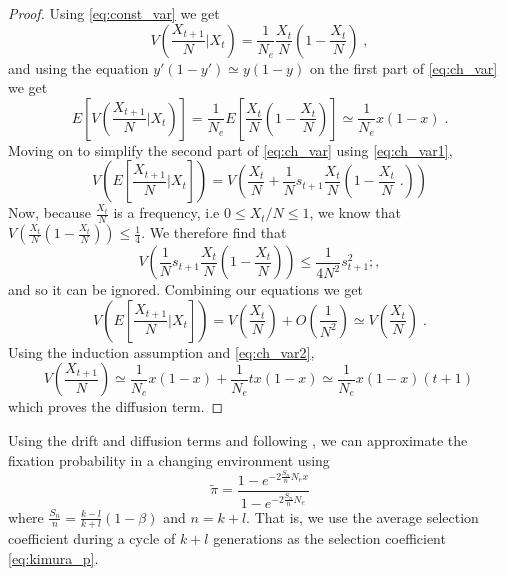 \documentclass[12pt]{extarticle}
\begin{document}
\begin{proof}
Using \cref{eq:const_var} we get
\begin{equation}
V\left(\frac{X_{t+1}}{N} \bigg|X_t \right) 
= \frac{1}{N_e}\frac{X_t}{N}\left(1-\frac{X_t}{N} \right) \;,
\end{equation}
and using the equation $y'(1-y') \simeq y(1-y)$ on the first part of \cref{eq:ch_var} we get
\begin{equation}\label{eq:ch_var2}
E\left[V\left(\frac{X_{t+1}}{N} \bigg|X_t \right)\right] 
= \frac{1}{N_e}E\left[\frac{X_t}{N}\left(1- \frac{X_t}{N}\right) \right] \simeq \frac{1}{N_e} x(1-x) \;.
\end{equation}
Moving on to simplify the second part of \cref{eq:ch_var} using \cref{eq:ch_var1},
\begin{equation}
V\left(E\left[\frac{X_{t+1}}{N} \bigg|X_t \right]\right) 
= V\left(\frac{X_t}{N} + \frac{1}{N}s_{t+1}\frac{X_t}{N}\left(1-\frac{X_t}{N} \;.\right) \right)
\end{equation}
Now, because $\frac{X_t}{N}$ is a frequency, i.e $0 \leq X_t/N \leq 1$, we know that $V\left(\frac{X_t}{N}\left(1-\frac{X_t}{N} \right) \right)\leq\frac{1}{4}$. We therefore find that
\begin{equation}
V\left(\frac{1}{N}s_{t+1}\frac{X_t}{N}\left(1-\frac{X_t}{N} \right) \right)
\leq \frac{1}{4N^2}s^2_{t+1} ;,
\end{equation}
and so it can be ignored.
Combining our equations we get
\begin{equation}
V\left(E\left[\frac{X_{t+1}}{N} \bigg|X_t \right]\right) 
= V\left(\frac{X_t}{N}\right) + O\left(\frac{1}{N^2}\right)\simeq V\left(\frac{X_t}{N}\right) \;.
\end{equation}
Using the induction assumption and \cref{eq:ch_var2},
\begin{equation}
V\left(\frac{X_{t+1}}{N}\right) 
\simeq \frac{1}{N_e}x(1-x) + \frac{1}{N_e}tx(1-x) \simeq \frac{1}{N_e}x(1-x)(t+1) \,
\end{equation}
which proves the diffusion term.
\end{proof}


Using the drift and diffusion terms and following \citet{changeEnv}, we can approximate the fixation probability in a changing environment using
\begin{equation}\label{eq:ch_env}
\tilde\pi = \frac{1-e^{-2 \frac{S_n}{n} N_e x}}{1-e^{-2 \frac{S_n}{n} N_e}}
\end{equation}
where $\frac{S_n}{n} = \frac{k-l}{k+l}(1-\beta)$ and $n=k+l$.
That is, we use the average selection coefficient during a cycle of $k+l$ generations as the selection coefficient \cref{eq:kimura_p}.
\end{document}
